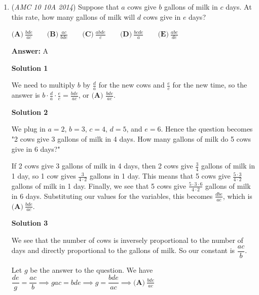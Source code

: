 \begin{enumerate}
 \begin{verbatim}
\href{https://youtu.be/OHF3WWRq0h4}{https://youtu.be/OHF3WWRq0h4}
\end{verbatim}





	\item (\textit{AMC 10 10A 2014}) Suppose that $a$ cows give $b$ gallons of milk in $c$ days. At this rate, how many gallons of milk will $d$ cows give in $e$ days?


 $\textbf{(A)}\ \frac{bde}{ac}\qquad\textbf{(B)}\ \frac{ac}{bde}\qquad\textbf{(C)}\ \frac{abde}{c}\qquad\textbf{(D)}\ \frac{bcde}{a}\qquad\textbf{(E)}\ \frac{abc}{de}$

 \textbf{Answer: }A



\textbf{Solution 1}

We need to multiply $b$ by $\frac{d}{a}$ for the new cows and $\frac{e}{c}$ for the new time, so the answer is $b\cdot \frac{d}{a}\cdot \frac{e}{c}=\frac{bde}{ac}$, or $\boxed{\textbf{(A) } \frac{bde}{ac}}$.

 



\textbf{Solution 2}

We plug in $a=2$, $b=3$, $c=4$, $d=5$, and $e=6$. Hence the question becomes "2 cows give 3 gallons of milk in 4 days. How many gallons of milk do 5 cows give in 6 days?"

 If 2 cows give 3 gallons of milk in 4 days, then 2 cows give $\frac{3}{4}$ gallons of milk in 1 day, so 1 cow gives $\frac{3}{4\cdot2}$ gallons in 1 day. This means that 5 cows give $\frac{5\cdot3}{4\cdot2}$ gallons of milk in 1 day. Finally, we see that 5 cows give $\frac{5\cdot3\cdot6}{4\cdot2}$ gallons of milk in 6 days. Substituting our values for the variables, this becomes $\frac{dbe}{ac}$, which is $\boxed{\textbf{(A)}\ \frac{bde}{ac}}$.

 



\textbf{Solution 3}

We see that the number of cows is inversely proportional to the number of days and directly proportional to the gallons of milk. So our constant is $\dfrac{ac}{b}$.

 Let $g$ be the answer to the question. We have $\dfrac{de}{g}=\dfrac{ac}{b}\implies gac=bde\implies g=\dfrac{bde}{ac}\implies\boxed{ \textbf{(A)}\ \frac{bde}{ac}}$





\end{enumerate}
